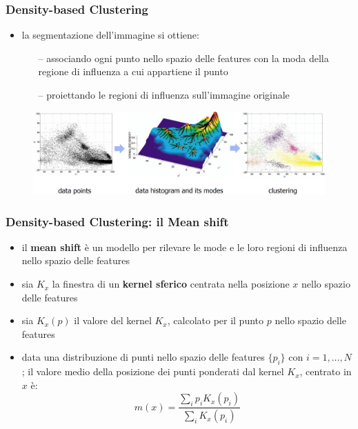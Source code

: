 \begin{frame}

	\frametitle{{\color{GradientDescentDiagramRed}Density-based Clustering}}


		\begin{itemize}
			\item la segmentazione dell'immagine si ottiene:
				\begin{itemize}
					\item[--] associando ogni punto nello spazio delle features con la moda della regione di influenza a cui appartiene il punto
					\item[--] proiettando le regioni di influenza sull'immagine originale
				\end{itemize}
		\end{itemize}

		\begin{figure}[!htbp]
			\centering
			\includegraphics[width=1.0\linewidth]{images/unsupervised/non_parametric/meanshift_segmentation_how_works.png}
		\end{figure}


\end{frame}


\begin{frame}

	\frametitle{{\color{GradientDescentDiagramRed}Density-based Clustering}: il Mean shift}


		\begin{itemize}
			\item il \textbf{mean shift} è un modello per rilevare le mode e le loro regioni di influenza nello spazio delle features
			\item sia $K_x$ la finestra di un \textbf{kernel sferico} centrata nella posizione $x$ nello spazio delle features
			\item sia $K_x(p)$ il valore del kernel $K_x$, calcolato per il punto $p$ nello spazio delle features
			\item data una distribuzione di punti nello spazio delle features $\{p_i\}$ con $i=1,...,N$; il valore medio della posizione dei punti ponderati dal kernel $K_x$, centrato in $x$ è:
				$$m(x)=\frac{\sum_i p_i K_x(p_i)}{\sum_i K_x(p_i)}$$
		\end{itemize}


\end{frame}



